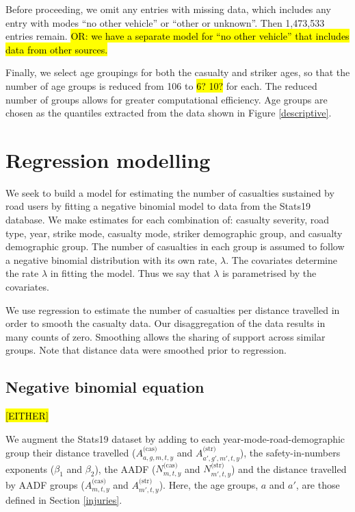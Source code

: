 \documentclass{article}
\begin{document}
Before proceeding, we omit any entries with missing data, which includes any entry with modes ``no other vehicle'' or ``other or unknown''. Then 1,473,533 entries remain. \hl{OR: we have a separate model for ``no other vehicle'' that includes data from other sources.}

Finally, we select age groupings for both the casualty and striker ages, so that the number of age groups is reduced from 106 to \hl{6? 10?} for each. The reduced number of groups allows for greater computational efficiency. Age groups are chosen as the quantiles extracted from the data shown in Figure \ref{descriptive}.


\section{Regression modelling}

We seek to build a model for estimating the number of casualties sustained by road users by fitting a negative binomial model to data from the Stats19 database. We make estimates for each combination of: casualty severity, road type, year, strike mode, casualty mode, striker demographic group, and casualty demographic group. The number of casualties in each group is assumed to follow a negative binomial distribution with its own rate, $\lambda$. The covariates determine the rate $\lambda$ in fitting the model. Thus we say that $\lambda$ is parametrised by the covariates.

We use regression to estimate the number of casualties per distance travelled in order to smooth the casualty data. Our disaggregation of the data results in many counts of zero. Smoothing allows the sharing of support across similar groups. Note that distance data were smoothed prior to regression.

\subsection{Negative binomial equation}

\hl{[EITHER]}

We augment the Stats19 dataset by adding to each year-mode-road-demographic group their distance travelled ($A_{a,g,m,t,y}^{\text{(cas)}}$ and $A_{a',g',m',t,y}^{\text{(str)}}$), the safety-in-numbers exponents ($\beta_1$ and $\beta_2$), the AADF ($N_{m,t,y}^{\text{(cas)}}$ and $N_{m',t,y}^{\text{(str)}}$) and the distance travelled by AADF groups ($A_{m,t,y}^{\text{(cas)}}$ and $A_{m',t,y}^{\text{(str)}}$). Here, the age groups, $a$ and $a'$, are those defined in Section \ref{injuries}.
\end{document}
